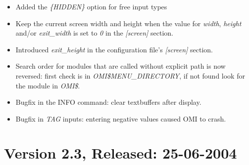 \documentclass[a4paper]{book}
\begin{document}
\begin{itemize}
\item Added the \textsl{\{HIDDEN\}} option for free input types
\item Keep the current screen width and height when the value for \textsl{width}, \textsl{height} and/or \textsl{exit{\_}width} is set to \textsl{0} in the \textsl{[screen]} section.
\item Introduced \textsl{exit{\_}height} in the configuration file's \textsl{[screen]} section.
\item Search order for modules that are called without explicit path is now reversed: first check is in \textsl{OMI{\$}MENU{\_}DIRECTORY}, if not found look for the module in \textsl{OMI{\$}}.
\item Bugfix in the \textsf{INFO} command: clear textbuffers after display.
\item Bugfix in \textsl{TAG} inputs: entering negative values caused OMI to crash.
\end{itemize}

\section*{Version 2.3, Released: 25-06-2004}
\end{document}
